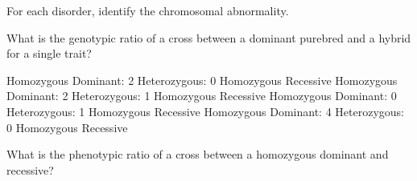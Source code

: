 \documentclass[addpoints]{exam}
\begin{document}
\begin{questions}

\question For each disorder, identify the chromosomal abnormality.


\question[1] What is the genotypic ratio of a cross between a dominant purebred and a hybrid for a single trait?

\begin{choices}

 Homozygous Dominant: 2 Heterozygous: 0 Homozygous Recessive
 Homozygous Dominant: 2 Heterozygous: 1 Homozygous Recessive
 Homozygous Dominant: 0 Heterozygous: 1 Homozygous Recessive
 Homozygous Dominant: 4 Heterozygous: 0 Homozygous Recessive

\end{choices}

\question[1] What is the phenotypic ratio of a cross between a homozygous dominant and recessive?

\begin{choices}


\end{choices}
\end{questions}
\end{document}
